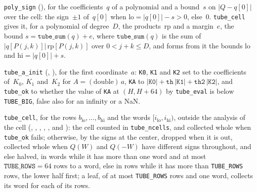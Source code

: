 \begin{definition}\label{def:tubeCell}
  \leanok
  \texttt{poly\_sign} (), for the coefficients~$q$ of a polynomial and a
  bound~$s$ on $|Q - q[0]|$ over the cell: the sign~$\pm 1$ of~$q[0]$ when
  $\mathrm{lo} = |q[0]| - s > 0$, else~$0$. \texttt{tube\_cell} gives it, for a polynomial of
  degree~$D$, the products~$\mathrm{rp}$ and a margin~$e$, the bound $s = \mathtt{tube\_sum}(q) + e$,
  where $\mathtt{tube\_sum}(q)$ is the sum of $|q[P(j, k)]|\,\mathrm{rp}[P(j, k)]$ over
  $0 < j + k \le D$, and forms from it the bounds $\mathrm{lo}$ and $\mathrm{hi} = |q[0]| + s$.

  \texttt{tube\_a\_init} (, ), for the first
  coordinate~$a$: \texttt{K0}, \texttt{K1} and
  \texttt{K2} set to the coefficients of~$K_0$, $K_1$ and~$K_2$ for $A = (\mathrm{double})\,a$,
  \texttt{KA} to $|\mathtt{K0}| + \mathtt{th}\,|\mathtt{K1}| + \mathtt{th2}\,|\mathtt{K2}|$, and
  \texttt{tube\_ok} to whether the value of \texttt{KA} at $(H, H + 64)$ by \texttt{tube\_eval} is
  below \texttt{TUBE\_BIG}, false also for an infinity or a NaN.

  \texttt{tube\_cell}, for the rows $b_{\mathrm{lo}}, \dots, b_{\mathrm{hi}}$ and the words
  $[i_{\mathrm{lo}}, i_{\mathrm{hi}})$, outside the analysis of the cell
  (, , ,
  , ,  and
  ): the cell counted in \texttt{tube\_ncells}, and collected whole when
  \texttt{tube\_ok} fails;
  otherwise, by the signs at the center, dropped when it is out, collected whole when $Q(W)$ and
  $Q(-W)$ have different signs throughout, and else halved, in words while it has more than one
  word and at most $\mathtt{TUBE\_ROWS} = 64$ rows to a word, else in rows while it has more than
  \texttt{TUBE\_ROWS} rows, the lower half first; a leaf, of at most \texttt{TUBE\_ROWS} rows and
  one word, collects its word for each of its rows.
\end{definition}


